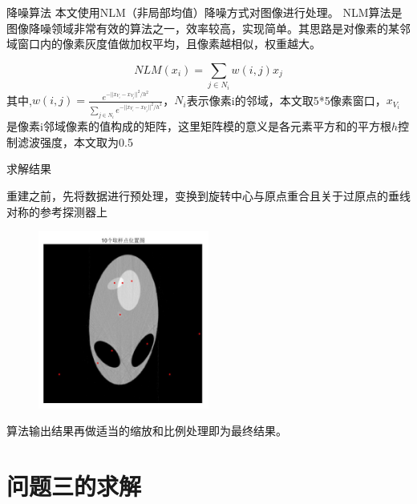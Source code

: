 \documentclass[serif]{beamer} %
\begin{document}
  
  
\begin{frame}{降噪算法}
	本文使用NLM（非局部均值）降噪方式对图像进行处理。 NLM算法是图像降噪领域非常有效的算法之一，效率较高，实现简单。其思路是对像素的某邻域窗口内的像素灰度值做加权平均，且像素越相似，权重越大。
	  
	\begin{equation}
		NLM(x_{i})=\sum_{j\in N_{i}} w(i,j)x_{j}
	\end{equation}
	其中,\(w(i,j)=\frac{e^{-||x_{V_{i}}-x_{V_{j}}||^2/h^2}}{\sum_{j\in N_{i}}e^{-||x_{V_{i}}-x_{V_{j}}||^2/h^2}}\)，$N_{i}$表示像素i的邻域，本文取5*5像素窗口，$x_{V_{i}}$是像素i邻域像素的值构成的矩阵，这里矩阵模的意义是各元素平方和的平方根$h$控制滤波强度，本文取为0.5
\end{frame}
  
  
  
\begin{frame}{求解结果}
	  
	\small 重建之前，先将数据进行预处理，变换到旋转中心与原点重合且关于过原点的垂线对称的参考探测器上\\
	  
	\begin{figure}[H]
		\centering
		\includegraphics[width=0.5\textwidth]{./pic/DOT.jpg}\\
	\end{figure}
	  
	算法输出结果再做适当的缩放和比例处理即为最终结果。
	  
\end{frame}
  
  
  
\section{问题三的求解}
  
\end{document}
